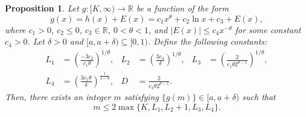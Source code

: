 \documentclass[12pt]{amsart}
\numberwithin{equation}{section}
\newtheorem{prop}[thm]{Proposition}
\newcommand{\R}{\mathbb{R}}
\begin{document}
\begin{prop}
\label{prop:framework}
Let $g: [K, \infty) \rightarrow \R$ be a function of the form 
\begin{equation*}
g(x) = h(x) + E(x) = c_{1}x^{\theta}+ c_{2}\ln x+c_{3}+E(x),
\end{equation*}
where $c_{1} > 0$, $c_{2} \leq 0$, $c_{3}\in \R$, $0<\theta<1$, and $|E(x)| \leq c_{4}x^{-\theta}$ for some constant $c_{4}>0$. Let $\delta > 0$ and $[a, a+\delta) \subseteq [0,1)$. Define the following constants:
\begin{align*}
L_1 &= \left(\frac{-3c_{2}}{c_{1}\theta}\right)^{1/\theta}, & L_2 &= \left(\frac{3 c_{4}}{\delta}\right)^{1/\theta}, & L_3 &= \left(\frac{2}{c_1 \theta 2^{\theta-1}}\right)^{1/\theta}, \\
L_4 &= \left(\frac{3 c_{1} \theta}{\delta} \right)^{\frac{1}{1-\theta}}, & D &= \frac{2}{c_{1}\theta 2^{\theta-1}}. & &
\end{align*}
Then, there exists an integer $m$ satisfying $\{g(m)\} \in [a,a+\delta)$ such that
\begin{equation*}
m \leq 2\max\{K, L_{1}, L_{2}+1, L_{3}, L_{4}\}.
\end{equation*}
\end{prop}
\end{document}
